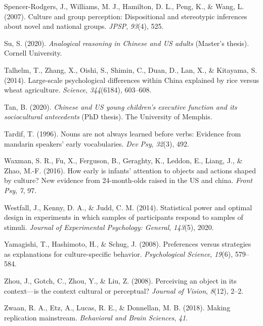 \documentclass[
  man]{apa6}
\newlength{\cslhangindent}
\newlength{\cslentryspacingunit} %
\newenvironment{CSLReferences}[2] %
 {%
  \setlength{\parindent}{0pt}
  \ifodd #1
  \let\oldpar\par
  \def\par{\hangindent=\cslhangindent\oldpar}
  \fi
  \setlength{\parskip}{#2\cslentryspacingunit}
 }%
 {}
\begin{document}
\begin{CSLReferences}{1}{0}
\leavevmode{}%
Spencer-Rodgers, J., Williams, M. J., Hamilton, D. L., Peng, K., \& Wang, L. (2007). Culture and group perception: Dispositional and stereotypic inferences about novel and national groups. \emph{JPSP}, \emph{93}(4), 525.

\leavevmode{}%
Su, S. (2020). \emph{Analogical reasoning in {C}hinese and {US} adults} (Master's thesis). Cornell University.

\leavevmode{}%
Talhelm, T., Zhang, X., Oishi, S., Shimin, C., Duan, D., Lan, X., \& Kitayama, S. (2014). Large-scale psychological differences within {C}hina explained by rice versus wheat agriculture. \emph{Science}, \emph{344}(6184), 603--608.

\leavevmode{}%
Tan, B. (2020). \emph{Chinese and US young children's executive function and its sociocultural antecedents} (PhD thesis). The University of Memphis.

\leavevmode{}%
Tardif, T. (1996). Nouns are not always learned before verbs: Evidence from mandarin speakers' early vocabularies. \emph{Dev Psy}, \emph{32}(3), 492.

\leavevmode{}%
Waxman, S. R., Fu, X., Ferguson, B., Geraghty, K., Leddon, E., Liang, J., \& Zhao, M.-F. (2016). How early is infants' attention to objects and actions shaped by culture? New evidence from 24-month-olds raised in the US and china. \emph{Front Psy}, \emph{7}, 97.

\leavevmode{}%
Westfall, J., Kenny, D. A., \& Judd, C. M. (2014). Statistical power and optimal design in experiments in which samples of participants respond to samples of stimuli. \emph{Journal of Experimental Psychology: General}, \emph{143}(5), 2020.

\leavevmode{}%
Yamagishi, T., Hashimoto, H., \& Schug, J. (2008). Preferences versus strategies as explanations for culture-specific behavior. \emph{Psychological Science}, \emph{19}(6), 579--584.

\leavevmode{}%
Zhou, J., Gotch, C., Zhou, Y., \& Liu, Z. (2008). Perceiving an object in its context---is the context cultural or perceptual? \emph{Journal of Vision}, \emph{8}(12), 2--2.

\leavevmode{}%
Zwaan, R. A., Etz, A., Lucas, R. E., \& Donnellan, M. B. (2018). Making replication mainstream. \emph{Behavioral and Brain Sciences}, \emph{41}.

\end{CSLReferences}
\end{document}
